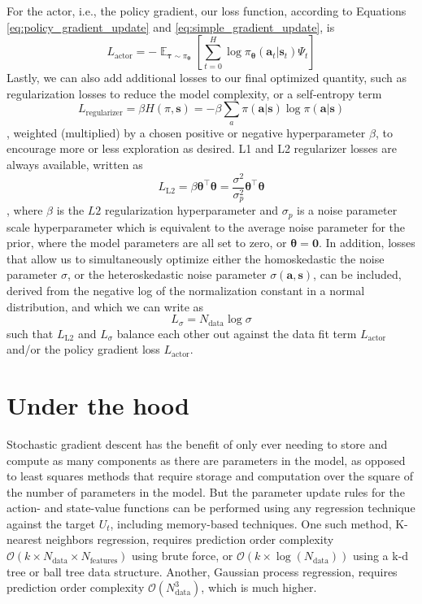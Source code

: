 \documentclass{article}
\begin{document}
For the actor, i.e., the policy gradient, our loss function, according to Equations \ref{eq:policy_gradient_update} and \ref{eq:simple_gradient_update}, is \begin{equation}L_\text{actor}=-\mathop{\mathbb{E}}_{\boldsymbol{\tau}\sim\pi_{\boldsymbol{\theta}}}\left[\sum_{t=0}^H\log\pi_{\boldsymbol{\theta}}(\mathbf{a}_t|\mathbf{s}_t)\Psi_t\right]\end{equation}Lastly, we can also add additional losses to our final optimized quantity, such as regularization losses to reduce the model complexity, or a self-entropy term \begin{equation}L_\text{regularizer}=\beta H(\pi, \mathbf{s})=-\beta \sum_a\pi(\mathbf{a}|\mathbf{s})\log\pi(\mathbf{a}|\mathbf{s})\end{equation}, weighted (multiplied) by a chosen positive or negative hyperparameter $\beta$, to encourage more or less exploration as desired.  L1 and L2 regularizer losses are always available, written as \begin{equation}L_\text{L2}=\beta\boldsymbol{\theta}^\top\boldsymbol{\theta}=\frac{\sigma^2}{\sigma_p^2}\boldsymbol{\theta}^\top\boldsymbol{\theta}\end{equation}, where $\beta$ is the $L2$ regularization hyperparameter and $\sigma_p$ is a noise parameter scale hyperparameter which is equivalent to the average noise parameter for the prior, where the model parameters are all set to zero, or $\boldsymbol{\theta}=\mathbf{0}$. In addition, losses that allow us to simultaneously optimize either the homoskedastic the noise parameter $\sigma$, or the heteroskedastic noise parameter $\sigma(\mathbf{a},\mathbf{s})$, can be included, derived from the negative log of the normalization constant in a normal distribution, and which we can write as \begin{equation}L_\sigma=N_\text{data}\log\sigma\end{equation}such that $L_\text{L2}$ and $L_\sigma$ balance each other out against the data fit term $L_\text{actor}$ and/or the policy gradient loss $L_\text{actor}$.

\section{Under the hood}

Stochastic gradient descent has the benefit of only ever needing to store and compute as many components as there are parameters in the model, as opposed to least squares methods that require storage and computation over the square of the number of parameters in the model. But the parameter update rules for the action- and state-value functions can be performed using any regression technique against the target $U_t$, including memory-based techniques. One such method, K-nearest neighbors regression, requires prediction order complexity $\mathcal{O}(k\times N_\text{data}\times N_\text{features})$ using brute force, or $\mathcal{O}(k\times \log(N_\text{data}))$ using a k-d tree or ball tree data structure. Another, Gaussian process regression, requires prediction order complexity $\mathcal{O}(N_\text{data}^3)$, which is much higher. 
\end{document}
